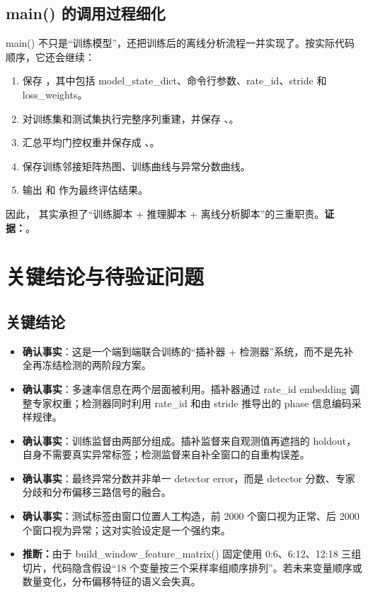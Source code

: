 \documentclass[11pt,a4paper]{ctexart}
\newcommand{\code}[1]{{\ttfamily\small #1}}
\newcommand{\evidence}[1]{\textbf{证据：}#1}
\newcommand{\inference}[1]{\textbf{推断：}#1}
\begin{document}
\subsection{main() 的调用过程细化}

\code{main()} 不只是“训练模型”，还把训练后的离线分析流程一并实现了。按实际代码顺序，它还会继续：
\begin{enumerate}
  \item 保存 ，其中包括 \code{model\_state\_dict}、命令行参数、\code{rate\_id}、\code{stride} 和 \code{loss\_weights}。
  \item 对训练集和测试集执行完整序列重建，并保存 、。
  \item 汇总平均门控权重并保存成 、。
  \item 保存训练邻接矩阵热图、训练曲线与异常分数曲线。
  \item 输出  和  作为最终评估结果。
\end{enumerate}

因此， 其实承担了“训练脚本 + 推理脚本 + 离线分析脚本”的三重职责。\evidence{。}

\section{关键结论与待验证问题}

\subsection{关键结论}

\begin{itemize}
  \item \textbf{确认事实}：这是一个端到端联合训练的“插补器 + 检测器”系统，而不是先补全再冻结检测的两阶段方案。
  \item \textbf{确认事实}：多速率信息在两个层面被利用。插补器通过 \code{rate\_id} embedding 调整专家权重；检测器同时利用 \code{rate\_id} 和由 \code{stride} 推导出的 phase 信息编码采样规律。
  \item \textbf{确认事实}：训练监督由两部分组成。插补监督来自观测值再遮挡的 holdout，自身不需要真实异常标签；检测监督来自补全窗口的自重构误差。
  \item \textbf{确认事实}：最终异常分数并非单一 detector error，而是 detector 分数、专家分歧和分布偏移三路信号的融合。
  \item \textbf{确认事实}：测试标签由窗口位置人工构造，前 2000 个窗口视为正常、后 2000 个窗口视为异常；这对实验设定是一个强约束。
  \item \inference{由于 \code{build\_window\_feature\_matrix()} 固定使用 \code{0:6}、\code{6:12}、\code{12:18} 三组切片，代码隐含假设“18 个变量按三个采样率组顺序排列”。若未来变量顺序或数量变化，分布偏移特征的语义会失真。}
\end{itemize}
\end{document}
